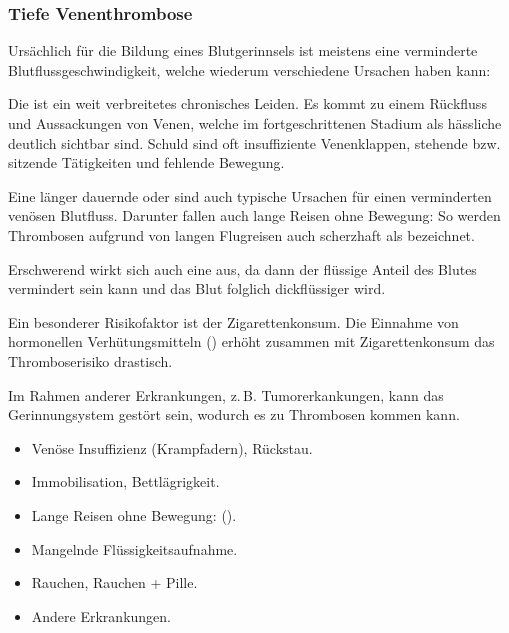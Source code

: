 
\subsubsection{Tiefe Venenthrombose}



{
Ursächlich für die Bildung eines Blutgerinnsels ist meistens eine verminderte
Blutflussgeschwindigkeit, welche wiederum verschiedene Ursachen haben kann: 

Die  ist ein weit verbreitetes chronisches Leiden.
 Es kommt  zu einem Rückfluss und Aussackungen von
Venen, welche im fortgeschrittenen Stadium als hässliche  deutlich
sichtbar sind. Schuld sind oft insuffiziente Venenklappen, stehende bzw. sitzende
Tätigkeiten und fehlende Bewegung.

Eine länger dauernde  oder  sind auch
typische Ursachen für einen verminderten venösen Blutfluss. Darunter fallen auch
lange Reisen ohne Bewegung: So werden Thrombosen aufgrund von langen Flugreisen
auch scherzhaft als  bezeichnet.

Erschwerend wirkt sich auch eine  aus, da
dann der flüssige Anteil des Blutes vermindert sein kann und das Blut folglich
dickflüssiger wird.

Ein besonderer Risikofaktor ist der Zigarettenkonsum. Die Einnahme von
hormonellen Verhütungsmitteln () erhöht zusammen mit Zigarettenkonsum
das Thromboserisiko drastisch.

Im Rahmen anderer Erkrankungen, z.\,B. Tumorerkankungen, kann das Gerinnungsystem
gestört sein, wodurch es zu Thrombosen kommen kann.
}{
\begin{itemize}
  \item Venöse Insuffizienz (Krampfadern), Rückstau. 
  \item Immobilisation, Bettlägrigkeit. 
  \item Lange Reisen ohne Bewegung: (). 
  \item Mangelnde Flüssigkeitsaufnahme. 
  \item Rauchen, Rauchen + Pille.
  \item Andere Erkrankungen. 
\end{itemize}
}{}{}{}

